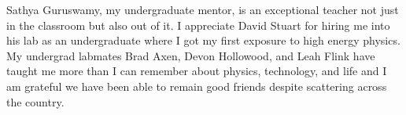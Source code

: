 Sathya Guruswamy, my undergraduate mentor, is an exceptional teacher not just in the classroom but also out of it.
I appreciate David Stuart for hiring me into his lab as an undergraduate where I got my first exposure to high energy physics.
My undergrad labmates Brad Axen, Devon Hollowood, and Leah Flink have taught me more than I can remember about physics, technology, and life and I am grateful we have been able to remain good friends despite scattering across the country.

